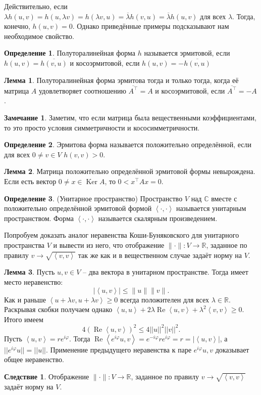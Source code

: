 \documentclass[10pt,a4paper,oneside]{book} %
\theoremstyle{definition}
\newtheorem*{rem}{Замечание}
\newtheorem*{defn}{Определение}
\newtheorem{lem}{Лемма}
\newtheorem{cor}{Следствие}
\newcommand{\mb}[1]{\mathbb{#1}}
\newcommand{\ovl}{\overline}
\DeclareMathOperator{\Ker}{Ker}
\renewcommand{\Re}{\operatorname{Re}}
\def\ffi{\varphi}
\def\lan{\left\langle }
\def\ran{\right\rangle}
\def\dfn{\begin{defn}}
\def\edfn{\end{defn}}
\def\lm{\begin{lem}}
\def\elm{\end{lem}}
\def\crl{\begin{cor}}
\def\ecrl{\end{cor}}
\def\rm{\begin{rem}}
\def\erm{\end{rem}}
\begin{document}
Действительно, если $\lambda h(u,v)=h(u,\lambda v) = h(\lambda v,u)=\ovl{\lambda}h(v,u)=\ovl{\lambda}h(u,v)$ для всех $\lambda$. Тогда, конечно, $h(u,v)=0$. Однако приведённые примеры подсказывают нам необходимое свойство.

\dfn Полуторалинейная форма $h$ называется эрмитовой, если $h(u,v)=\ovl{h(v,u)}$ и косоэрмитовой, если $h(u,v)=-\ovl{h(v,u)}$
\edfn

\lm Полуторалинейная форма эрмитова тогда и только тогда, когда её матрица $A$ удовлетворяет соотношению $\ovl{A^{\top}}=A$ и косоэрмитовой, если $\ovl{A^{\top}}=-A$.
\elm

\rm  Заметим, что если матрица была вещественными коэффициентами, то это просто условия  симметричности и кососимметричности.
\erm

\dfn Эрмитова форма называется положительно определённой, если для всех $0\neq v\in V$ $h(v,v)>0$.
\edfn

\lm Матрица положительно определённой эрмитовой формы невырождена.
\proof Если есть вектор $0\neq x\in \Ker A$, то $0<x^{\top}Ax = 0$.
\endproof
\elm

\dfn(Унитарное пространство) Пространство $V$ над $\mb C$ вместе с положительно определённой эрмитовой формой $\lan \cdot, \cdot \ran$ называется унитарным пространством. Форма $\lan \cdot, \cdot \ran$ называется скалярным произведением. 
\edfn

Попробуем доказать аналог неравенства Коши-Буняковского для унитарного пространства $V$ и вывести из него, что отображение $\|\cdot\| \colon V \to \mb R$, заданное по правилу $v\to \sqrt{\lan v,v\ran}$ так же как и в вещественном случае задаёт  норму на $V$.

\lm Пусть $u,v \in V$ -- два вектора в унитарном пространстве. Тогда имеет место неравенство:
$$|\lan u,v\ran| \leq \|u\| \|v\|.$$
\proof Как и раньше  $\lan u+\lambda v, u+\lambda v\ran \geq 0$ всегда положителен для всех $\lambda \in \mb R$. Раскрывая скобки получаем однако $\lan u,u\ran +2\lambda \Re\lan u,v\ran +\lambda^2\lan v,v\ran\geq 0$.  Итого имеем  $$4(\Re\lan u,v\ran)^2 \leq 4 ||u||^2||v||^2.$$
Пусть $\lan u ,v \ran = r e^{i\ffi}$. Тогда $\Re \lan  e^{i\ffi}u , v \ran= e^{-i\ffi} r e^{i\ffi}=r=|\lan u,v\ran|$, а $||e^{i\ffi}u||=||u||$. Применение предыдущего неравенства  к паре $e^{i\ffi} u, v$ доказывает общее неравенство.
\endproof
\elm

\crl Отображение $\|\cdot\| \colon V \to \mb R$, заданное по правилу $v\to \sqrt{\lan v,v\ran}$ задаёт  норму на $V$.
\ecrl
\end{document}
